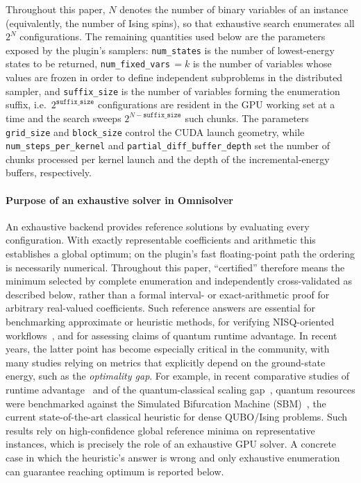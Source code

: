 \documentclass[preprint,12pt,a4paper]{elsarticle}
\begin{document}
Throughout this paper, $N$ denotes the number of binary variables of an instance
(equivalently, the number of Ising spins), so that exhaustive search enumerates
all $2^{N}$ configurations. The remaining quantities used below are the
parameters exposed by the plugin's samplers: \texttt{num\_states} is the number
of lowest-energy states to be returned, \texttt{num\_fixed\_vars}\,$=k$ is the
number of variables whose values are frozen in order to define independent
subproblems in the distributed sampler, and \texttt{suffix\_size} is the number
of variables forming the enumeration suffix, i.e.\ $2^{\texttt{suffix\_size}}$
configurations are resident in the GPU working set at a time and the search
sweeps $2^{N-\texttt{suffix\_size}}$ such chunks. The parameters
\texttt{grid\_size} and \texttt{block\_size} control the CUDA launch geometry,
while \texttt{num\_steps\_per\_kernel} and \texttt{partial\_diff\_buffer\_depth}
set the number of chunks processed per kernel launch and the depth of the
incremental-energy buffers, respectively.

\paragraph{Purpose of an exhaustive solver in Omnisolver}
An exhaustive backend provides reference solutions by evaluating every configuration. With
exactly representable coefficients and arithmetic this establishes a global optimum; on the
plugin's fast floating-point path the ordering is necessarily numerical. Throughout this paper,
``certified'' therefore means the minimum selected by complete enumeration and independently
cross-validated as described below, rather than a formal interval- or exact-arithmetic proof for
arbitrary real-valued coefficients. Such reference answers are essential for
benchmarking approximate or heuristic methods, for verifying NISQ-oriented
workflows~\cite{preskill2018quantum}, and for assessing claims of quantum
runtime advantage. In recent years, the latter point has become especially
critical in the community, with many studies relying on metrics that
explicitly depend on the ground-state energy, such as the \emph{optimality gap}.
For example, in recent comparative studies of runtime
advantage~\cite{tuziemski2026limits} and of the quantum-classical scaling
gap~\cite{pawlowski2025closing}, quantum resources were benchmarked against the
Simulated Bifurcation Machine
(SBM)~\cite{goto2016bifurcation,goto2019combinatorial,goto2021high,pawlowski2026sbqa},
the current state-of-the-art classical heuristic for dense QUBO/Ising problems.
Such results rely on high-confidence global reference minima on representative
instances, which is precisely the role of an exhaustive GPU solver. A concrete
case in which the heuristic's answer is wrong and only exhaustive enumeration 
can guarantee reaching optimum is reported below.
\end{document}
